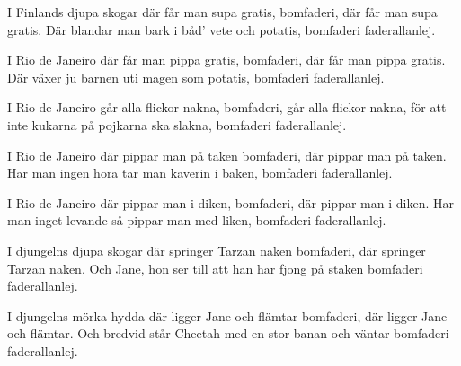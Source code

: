 


	
\beginverse*		%
I Finlands djupa skogar
där får man supa gratis,
bomfaderi,
där får man supa gratis.
Där blandar man bark
i båd' vete och potatis,
bomfaderi faderallanlej.
\endverse			%

\beginverse*		%
I Rio de Janeiro
där får man pippa gratis,
bomfaderi,
där får man pippa gratis.
Där växer ju barnen
uti magen som potatis,
bomfaderi faderallanlej.
\endverse			%

\beginverse*		%
I Rio de Janeiro
går alla flickor nakna,
bomfaderi,
går alla flickor nakna,
för att inte kukarna
på pojkarna ska slakna,
bomfaderi faderallanlej.
\endverse			%

\beginverse*		%
I Rio de Janeiro
där pippar man på taken
bomfaderi,
där pippar man på taken.
Har man ingen hora
tar man kaverin i baken,
bomfaderi faderallanlej.
\endverse			%

\beginverse*		%
I Rio de Janeiro
där pippar man i diken,
bomfaderi,
där pippar man i diken.
Har man inget levande
så pippar man med liken,
bomfaderi faderallanlej.
\endverse			%

\beginverse*		%
I djungelns djupa skogar
där springer Tarzan naken
bomfaderi,
där springer Tarzan naken.
Och Jane, hon ser till
att han har fjong på staken
bomfaderi faderallanlej.
\endverse			%

\beginverse*		%
I djungelns mörka hydda
där ligger Jane och flämtar
bomfaderi,
där ligger Jane och flämtar.
Och bredvid står Cheetah
med en stor banan och väntar
bomfaderi faderallanlej.
\endverse			%
\endsong			%
